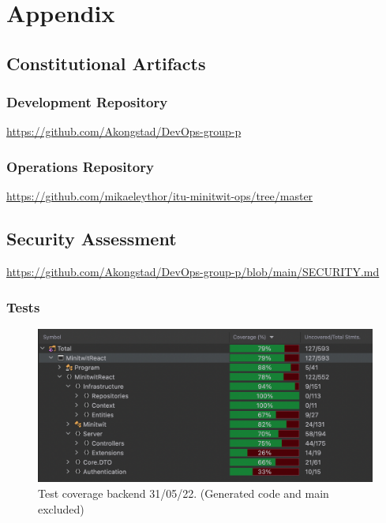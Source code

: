 \section{Appendix}
\label{app}

\subsection{Constitutional Artifacts}
\label{app:constArts}

\subsubsection{Development Repository}
\label{app:devRepo}
\href{https://github.com/Akongstad/DevOps-group-p}{https://github.com/Akongstad/DevOps-group-p}

\subsubsection{Operations Repository}
\label{app:opsRepo}
\href{https://github.com/mikaeleythor/itu-minitwit-ops/tree/master}{https://github.com/mikaeleythor/itu-minitwit-ops/tree/master}

\subsection{Security Assessment}
\label{app:secAss}
\href{https://github.com/Akongstad/DevOps-group-p/blob/main/SECURITY.md}{https://github.com/Akongstad/DevOps-group-p/blob/main/SECURITY.md}

\subsubsection{Tests}
\label{app:testSuite}
\begin {figure}[H]
    \centering
    \includegraphics[scale=0.42]{images/testCoverage.png}
    \caption{Test coverage backend 31/05/22. (Generated code and main excluded)}
    \label{fig:testCov}
\end{figure}


